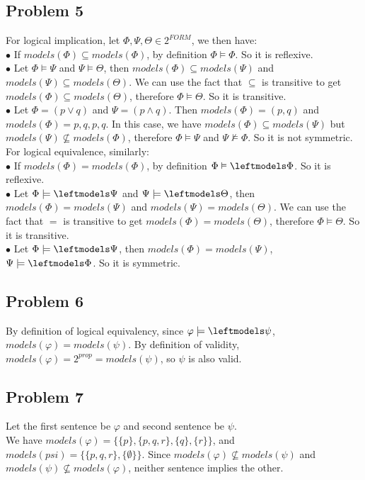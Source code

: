 \documentclass[12pt]{article}
\renewcommand{\phi}{\varphi}
\begin{document}
\subsection*{Problem 5}
For logical implication, let $\Phi, \Psi, \Theta \in 2^{FORM}$, we then have:\\[5pt]
$\bullet$ If $models(\Phi) \subseteq models(\Phi)$, by definition $\Phi \models \Phi$. So it is reflexive.\\[3pt]
$\bullet$ Let $\Phi \models \Psi$ and $\Psi \models \Theta$, then $models(\Phi) \subseteq models(\Psi)$ and $models(\Psi) \subseteq models(\Theta)$. We can use the fact that $\subseteq$ is transitive to get $models(\Phi) \subseteq models(\Theta)$, therefore $\Phi \models \Theta$. So it is transitive.\\[3pt]
$\bullet$ Let $\Phi = (p \vee q)$ and $\Psi = (p \wedge q)$. Then $models(\Phi) = {(p,q)}$ and $models(\Phi) = {{p}, {q}, {p, q}}$. In this case, we have $models(\Phi) \subseteq models(\Psi)$ but $models(\Psi) \nsubseteq models(\Phi)$, therefore $\Phi \models \Psi$ and $\Psi \nvDash \Phi$. So it is not symmetric. \\[10pt]
For logical equivalence, similarly:\\[5pt]
$\bullet$ If $models(\Phi) = models(\Phi)$, by definition $\Phi \vDash \leftmodels \Phi$. So it is reflexive.\\[3pt]
$\bullet$ Let $\Phi \models \leftmodels \Psi$ and $\Psi \models \leftmodels \Theta$, then $models(\Phi) = models(\Psi)$ and $models(\Psi) = models(\Theta)$. We can use the fact that $ = $ is transitive to get $models(\Phi) = models(\Theta)$, therefore $\Phi \models \Theta$. So it is transitive.\\[3pt]
$\bullet$ Let $\Phi \models \leftmodels \Psi$, then $models(\Phi) = models(\Psi)$, $\Psi \models \leftmodels \Phi$. So it is symmetric.
\subsection*{Problem 6}
By definition of logical equivalency, since $\phi \models \leftmodels \psi$, $models(\phi) = models(\psi)$. By definition of validity, $models(\phi) = 2^{prop} = models(\psi)$, so $\psi$ is also valid. 
\subsection*{Problem 7}
Let the first sentence be $\phi$ and second sentence be $\psi$.\\[5pt]
We have $models(\phi) = \{\{p\}, \{p,q,r\}, \{q\}, \{r\}\}$, and $models(psi) = \{\{p, q, r\}, \{\emptyset\}\}$. Since $models(\phi) \nsubseteq models(\psi)$ and $models(\psi) \nsubseteq models(\phi)$, neither sentence implies the other. 
\newpage
\end{document}
